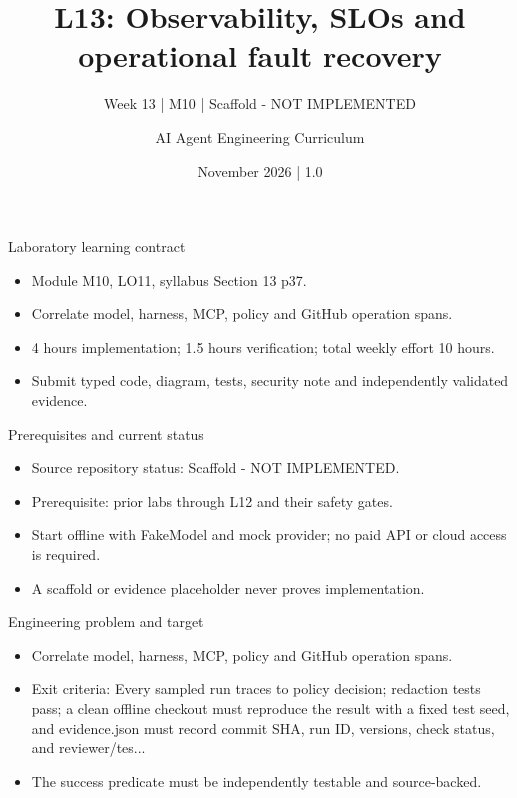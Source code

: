 \documentclass[aspectratio=169,10pt]{beamer}
\title[L13 - Agent Engineering]{L13: Observability, SLOs and operational fault recovery}
\subtitle{Week 13 | M10 | Scaffold - NOT IMPLEMENTED}
\author{AI Agent Engineering Curriculum}
\date{November 2026 | 1.0}
\begin{document}
\begin{frame}\titlepage\end{frame}

\begin{frame}{Laboratory learning contract}
\small
\begin{itemize}
\item Module M10, LO11, syllabus Section 13 p37.
\item Correlate model, harness, MCP, policy and GitHub operation spans.
\item 4 hours implementation; 1.5 hours verification; total weekly effort 10 hours.
\item Submit typed code, diagram, tests, security note and independently validated evidence.
\end{itemize}

\end{frame}

\begin{frame}{Prerequisites and current status}
\small
\begin{itemize}
\item Source repository status: Scaffold - NOT IMPLEMENTED.
\item Prerequisite: prior labs through L12 and their safety gates.
\item Start offline with FakeModel and mock provider; no paid API or cloud access is required.
\item A scaffold or evidence placeholder never proves implementation.
\end{itemize}

\end{frame}

\begin{frame}{Engineering problem and target}
\small
\begin{itemize}
\item Correlate model, harness, MCP, policy and GitHub operation spans.
\item Exit criteria: Every sampled run traces to policy decision; redaction tests pass; a clean offline checkout must reproduce the result with a fixed test seed, and evidence.json must record commit SHA, run ID, versions, check status, and reviewer/tes...
\item The success predicate must be independently testable and source-backed.
\end{itemize}

\end{frame}
\end{document}
